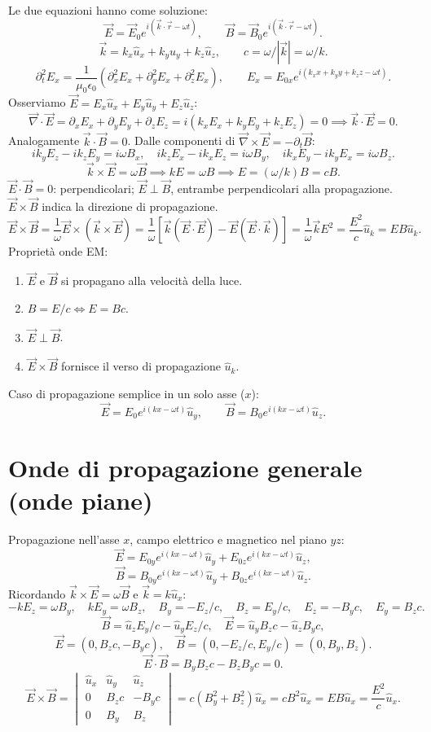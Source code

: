 \documentclass[11pt,a4paper]{article}
\newcommand{\pagina}[1]{\clearpage}
\newcommand{\vv}[1]{\vec{#1}}
\begin{document}
Le due equazioni hanno come soluzione:
\pagina{18}
\[\vv E=\vv E_0e^{i(\vv k\cdot\vv r-\omega t)},\qquad\vv B=\vv B_0e^{i(\vv k\cdot\vv r-\omega t)}.\]
\[\vv k=k_x\hat u_x+k_y\hat u_y+k_z\hat u_z,\qquad c=\omega/|\vv k|=\omega/k.\]
\[\partial_t^2E_x=\frac1{\mu_0\epsilon_0}(\partial_x^2E_x+\partial_y^2E_x+\partial_z^2E_x),\qquad E_x=E_{0x}e^{i(k_xx+k_yy+k_zz-\omega t)}.\]
Osserviamo $\vv E=E_x\hat u_x+E_y\hat u_y+E_z\hat u_z$:
\[\vv\nabla\cdot\vv E=\partial_xE_x+\partial_yE_y+\partial_zE_z=i(k_xE_x+k_yE_y+k_zE_z)=0\implies\vv k\cdot\vv E=0.\]
Analogamente $\vv k\cdot\vv B=0$.
Dalle componenti di $\vv\nabla\times\vv E=-\partial_t\vv B$:
\[ik_yE_z-ik_zE_y=i\omega B_x,\quad ik_zE_x-ik_xE_z=i\omega B_y,\quad ik_xE_y-ik_yE_x=i\omega B_z.\]
\[\vv k\times\vv E=\omega\vv B\implies kE=\omega B\implies E=(\omega/k)B=cB.\]
$\vv E\cdot\vv B=0$: perpendicolari; $\vv E\perp\vv B$, entrambe perpendicolari alla propagazione.
\pagina{19}
$\vv E\times\vv B$ indica la direzione di propagazione.
\[\vv E\times\vv B=\frac1\omega\vv E\times(\vv k\times\vv E)=\frac1\omega[\vv k(\vv E\cdot\vv E)-\vv E(\vv E\cdot\vv k)]=\frac1\omega\vv kE^2=\frac{E^2}c\hat u_k=EB\hat u_k.\]
Proprietà onde EM:
\begin{enumerate}\item $\vv E$ e $\vv B$ si propagano alla velocità della luce.\item $B=E/c\iff E=Bc$.\item $\vv E\perp\vv B$.\item $\vv E\times\vv B$ fornisce il verso di propagazione $\hat u_k$.\end{enumerate}
Caso di propagazione semplice in un solo asse ($x$):
\[\vv E=E_0e^{i(kx-\omega t)}\hat u_y,\qquad\vv B=B_0e^{i(kx-\omega t)}\hat u_z.\]
\section*{Onde di propagazione generale (onde piane)}
Propagazione nell'asse $x$, campo elettrico e magnetico nel piano $yz$:
\[\vv E=E_{0y}e^{i(kx-\omega t)}\hat u_y+E_{0z}e^{i(kx-\omega t)}\hat u_z,\]
\[\vv B=B_{0y}e^{i(kx-\omega t)}\hat u_y+B_{0z}e^{i(kx-\omega t)}\hat u_z.\]
\pagina{20}
Ricordando $\vv k\times\vv E=\omega\vv B$ e $\vv k=k\hat u_x$:
\[-kE_z=\omega B_y,\quad kE_y=\omega B_z,\quad B_y=-E_z/c,\quad B_z=E_y/c,\quad E_z=-B_yc,\quad E_y=B_zc.\]
\[\vv B=\hat u_zE_y/c-\hat u_yE_z/c,\quad\vv E=\hat u_yB_zc-\hat u_zB_yc,\]
\[\vv E=(0,B_zc,-B_yc),\quad\vv B=(0,-E_z/c,E_y/c)=(0,B_y,B_z).\]
\[\vv E\cdot\vv B=B_yB_zc-B_zB_yc=0.\]
\[\vv E\times\vv B=\begin{vmatrix}\hat u_x&\hat u_y&\hat u_z\\0&B_zc&-B_yc\\0&B_y&B_z\end{vmatrix}=c(B_y^2+B_z^2)\hat u_x=cB^2\hat u_x=EB\hat u_x=\frac{E^2}c\hat u_x.\]
\end{document}
